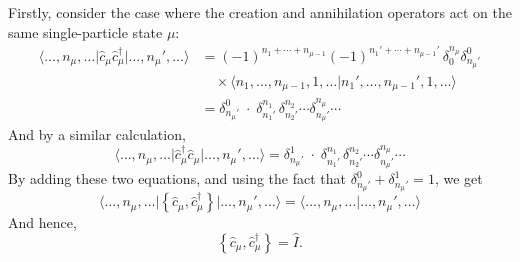 \documentclass[pra,12pt]{revtex4}
\begin{document}
Firstly, consider the case where the creation and annihilation
operators act on the same single-particle state $\mu$:
$$\begin{aligned}\big\langle \dots,n_\mu,\dots \big| \hat{c}_\mu \hat{c}_\mu^\dagger \big|\dots, n_\mu', \dots\big\rangle &= (-1)^{n_1+\cdots+n_{\mu-1}} (-1)^{n_1'+\cdots+n_{\mu-1}'} \,\delta^{n_\mu}_0 \delta^0_{n_\mu'} \\ &\quad\times \big\langle n_1,\dots,n_{\mu-1}, 1, \dots\big| n_1',\dots,n_{\mu-1}', 1, \dots \big\rangle \\ &= \delta^0_{n_\mu'} \; \cdot \; \delta^{n_1}_{n_1'} \, \delta^{n_2}_{n_2'} \cdots \delta^{n_\mu}_{n_\mu'} \cdots\end{aligned}$$
And by a similar calculation,
$$\big\langle \dots,n_\mu,\dots \big| \hat{c}_\mu^\dagger \hat{c}_\mu \big|\dots, n_\mu', \dots\big\rangle = \delta^1_{n_\mu'} \; \cdot \; \delta^{n_1}_{n_1'} \, \delta^{n_2}_{n_2'} \cdots \delta^{n_\mu}_{n_\mu'} \cdots$$
By adding these two equations, and using the fact that
$\delta^0_{n_\mu'} + \delta^1_{n_\mu'} = 1$, we get
$$\big\langle \dots,n_\mu,\dots \big| \left\{ \hat{c}_\mu, \hat{c}_\mu^\dagger\right\} \big|\dots, n_\mu', \dots\big\rangle = \big\langle \dots,n_\mu,\dots \big|\dots, n_\mu', \dots\big\rangle$$
And hence,
$$\left\{ \hat{c}_\mu, \hat{c}_\mu^\dagger\right\} = \hat{I}.$$
\end{document}
